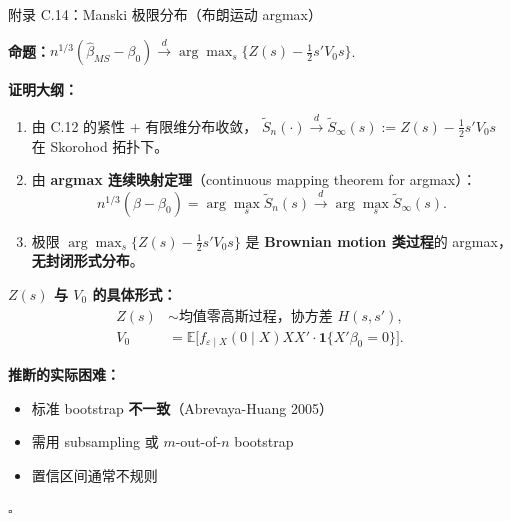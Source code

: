 \documentclass[aspectratio=169, 10pt]{beamer}
\begin{document}
\begin{frame}[shrink=10]{附录 C.14：Manski 极限分布（布朗运动 argmax）}
  \hypertarget{proof-c14}{}

  \textbf{命题：}$n^{1/3}(\hat\beta_{MS} - \beta_0) \overset{d}{\to}
  \arg\max_s \{Z(s) - \tfrac{1}{2} s' V_0 s\}$.

  \textbf{证明大纲：}
  \begin{enumerate}\setlength{\itemsep}{1pt}
    \item 由 C.12 的紧性 + 有限维分布收敛，
    $\tilde S_n(\cdot) \overset{d}{\to} \tilde S_\infty(s) := Z(s) - \tfrac{1}{2} s' V_0 s$
    在 Skorohod 拓扑下。

    \item 由 \textbf{argmax 连续映射定理}（continuous mapping theorem for argmax）：
    $$n^{1/3}(\hat\beta - \beta_0) = \arg\max_s \tilde S_n(s) \overset{d}{\to}
    \arg\max_s \tilde S_\infty(s).$$

    \item 极限 $\arg\max_s \{Z(s) - \tfrac{1}{2} s' V_0 s\}$ 是 \textbf{Brownian motion 类过程}的 argmax，
    \textbf{无封闭形式分布}。
  \end{enumerate}

  \textbf{$Z(s)$ 与 $V_0$ 的具体形式：}
  \begin{align*}
  Z(s) &\sim \text{均值零高斯过程，协方差 } H(s, s'), \\
  V_0 &= \mathbb{E}\bigl[f_{\varepsilon\mid X}(0\mid X) X X' \cdot \mathbf{1}\{X'\beta_0 = 0\}\bigr].
  \end{align*}

  \begin{keybox}
    \textbf{推断的实际困难：}
    \begin{itemize}\setlength{\itemsep}{1pt}
      \item 标准 bootstrap \textbf{不一致}（Abrevaya-Huang 2005）
      \item 需用 subsampling 或 $m$-out-of-$n$ bootstrap
      \item 置信区间通常不规则
    \end{itemize}
    $\square$
  \end{keybox}
  \hfill{\scriptsize\hyperlink{main-c14}{}}

\end{frame}
\end{document}
